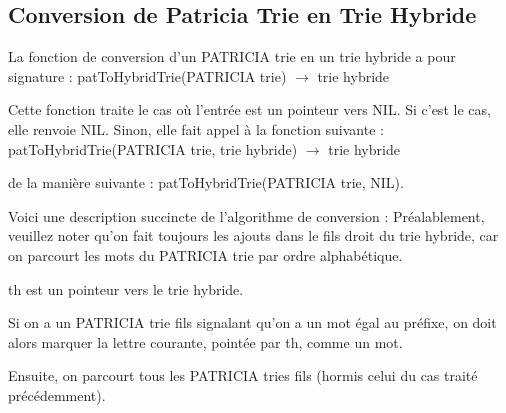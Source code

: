 \documentclass[a4paper,12pt]{report}
\begin{document}
\subsection{Conversion de Patricia Trie en Trie Hybride}

La fonction de conversion d'un PATRICIA trie en un trie hybride a pour signature : patToHybridTrie(PATRICIA trie) $\rightarrow$ trie hybride

Cette fonction traite le cas où l'entrée est un pointeur vers NIL.
Si c'est le cas, elle renvoie NIL. Sinon, elle fait appel à la fonction suivante :
patToHybridTrie(PATRICIA trie, trie hybride) $\rightarrow$ trie hybride

de la manière suivante : patToHybridTrie(PATRICIA trie, NIL).

Voici une description succincte de l'algorithme de conversion :
Préalablement, veuillez noter qu'on fait toujours les ajouts dans le fils droit du trie hybride, car on parcourt les mots du PATRICIA trie par ordre alphabétique.

th est un pointeur vers le trie hybride.

Si on a un PATRICIA trie fils signalant qu'on a un mot égal au préfixe, on doit alors marquer la lettre courante, pointée par th, comme un mot.

Ensuite, on parcourt tous les PATRICIA tries fils (hormis celui du cas traité précédemment).
\end{document}
